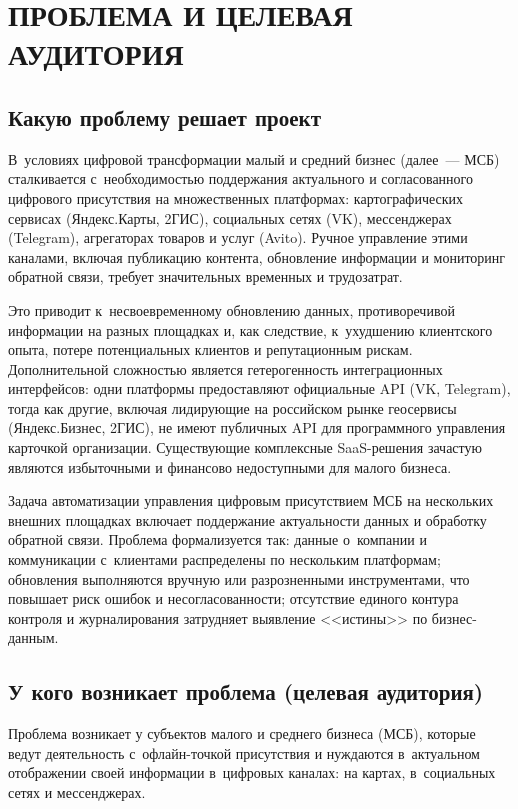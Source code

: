 \chapter{{\fontsize{14pt}{21pt}\selectfont\MakeUppercase{Проблема и целевая аудитория}}}
\label{ch:problem}

\section{Какую проблему решает проект}

В~условиях цифровой трансформации малый и средний бизнес (далее~--- МСБ) сталкивается с~необходимостью поддержания актуального и согласованного цифрового присутствия на множественных платформах: картографических сервисах (Яндекс.Карты, 2ГИС), социальных сетях (VK), мессенджерах (Telegram), агрегаторах товаров и услуг (Avito). Ручное управление этими каналами, включая публикацию контента, обновление информации и мониторинг обратной связи, требует значительных временных и трудозатрат.

Это приводит к~несвоевременному обновлению данных, противоречивой информации на разных площадках и, как следствие, к~ухудшению клиентского опыта, потере потенциальных клиентов и репутационным рискам. Дополнительной сложностью является гетерогенность интеграционных интерфейсов: одни платформы предоставляют официальные API (VK, Telegram), тогда как другие, включая лидирующие на российском рынке геосервисы (Яндекс.Бизнес, 2ГИС), не имеют публичных API для программного управления карточкой организации. Существующие комплексные SaaS-решения зачастую являются избыточными и финансово недоступными для малого бизнеса.

Задача автоматизации управления цифровым присутствием МСБ на нескольких внешних площадках включает поддержание актуальности данных и обработку обратной связи. Проблема формализуется так: данные о~компании и коммуникации с~клиентами распределены по нескольким платформам; обновления выполняются вручную или разрозненными инструментами, что повышает риск ошибок и несогласованности; отсутствие единого контура контроля и журналирования затрудняет выявление <<истины>> по бизнес-данным.

\section{У кого возникает проблема (целевая аудитория)}

Проблема возникает у субъектов малого и среднего бизнеса (МСБ), которые ведут деятельность с~офлайн-точкой присутствия и нуждаются в~актуальном отображении своей информации в~цифровых каналах: на картах, в~социальных сетях и мессенджерах.

